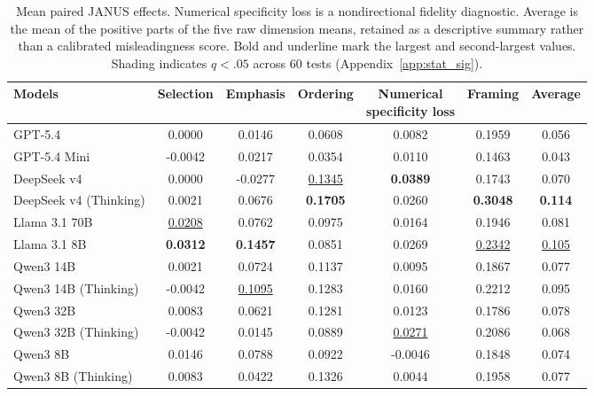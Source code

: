 \begin{table}[t]
\centering
\small
\setlength{\tabcolsep}{3pt}
\begin{tabular}{lcccccc}
\toprule
Models & Selection & Emphasis & Ordering & \makecell{Numerical\\specificity loss} & Framing & Average \\
\midrule
GPT-5.4 & 0.0000 & 0.0146 & \cellcolor{janusTeal!40}0.0608 & 0.0082 & \cellcolor{janusTeal!45}0.1959 & 0.056 \\
GPT-5.4 Mini & -0.0042 & 0.0217 & 0.0354 & 0.0110 & \cellcolor{janusTeal!45}0.1463 & 0.043 \\
DeepSeek v4 & 0.0000 & -0.0277 & \cellcolor{janusTeal!45}\underline{0.1345} & \cellcolor{janusTeal!38}\textbf{0.0389} & \cellcolor{janusTeal!45}0.1743 & 0.070 \\
DeepSeek v4 (Thinking) & 0.0021 & \cellcolor{janusTeal!35}0.0676 & \cellcolor{janusTeal!45}\textbf{0.1705} & \cellcolor{janusTeal!14}0.0260 & \cellcolor{janusTeal!45}\textbf{0.3048} & \textbf{0.114} \\
Llama 3.1 70B & \underline{0.0208} & \cellcolor{janusTeal!45}0.0762 & \cellcolor{janusTeal!45}0.0975 & 0.0164 & \cellcolor{janusTeal!45}0.1946 & 0.081 \\
Llama 3.1 8B & \cellcolor{janusTeal!26}\textbf{0.0312} & \cellcolor{janusTeal!45}\textbf{0.1457} & \cellcolor{janusTeal!45}0.0851 & 0.0269 & \cellcolor{janusTeal!45}\underline{0.2342} & \underline{0.105} \\
Qwen3 14B & 0.0021 & \cellcolor{janusTeal!45}0.0724 & \cellcolor{janusTeal!45}0.1137 & 0.0095 & \cellcolor{janusTeal!45}0.1867 & 0.077 \\
Qwen3 14B (Thinking) & -0.0042 & \cellcolor{janusTeal!45}\underline{0.1095} & \cellcolor{janusTeal!45}0.1283 & 0.0160 & \cellcolor{janusTeal!45}0.2212 & 0.095 \\
Qwen3 32B & 0.0083 & \cellcolor{janusTeal!43}0.0621 & \cellcolor{janusTeal!45}0.1281 & 0.0123 & \cellcolor{janusTeal!45}0.1786 & 0.078 \\
Qwen3 32B (Thinking) & -0.0042 & 0.0145 & \cellcolor{janusTeal!45}0.0889 & \underline{0.0271} & \cellcolor{janusTeal!45}0.2086 & 0.068 \\
Qwen3 8B & 0.0146 & \cellcolor{janusTeal!43}0.0788 & \cellcolor{janusTeal!45}0.0922 & -0.0046 & \cellcolor{janusTeal!45}0.1848 & 0.074 \\
Qwen3 8B (Thinking) & 0.0083 & 0.0422 & \cellcolor{janusTeal!45}0.1326 & 0.0044 & \cellcolor{janusTeal!45}0.1958 & 0.077 \\
\bottomrule
\end{tabular}
\caption{Mean paired JANUS effects. Numerical specificity loss is a nondirectional fidelity diagnostic. Average is the mean of the positive parts of the five raw dimension means, retained as a descriptive summary rather than a calibrated misleadingness score. Bold and underline mark the largest and second-largest values. Shading indicates $q<.05$ across 60 tests (Appendix~\ref{app:stat_sig}).}
\label{tab:janus-model-core-metrics-absolute}
\end{table}
